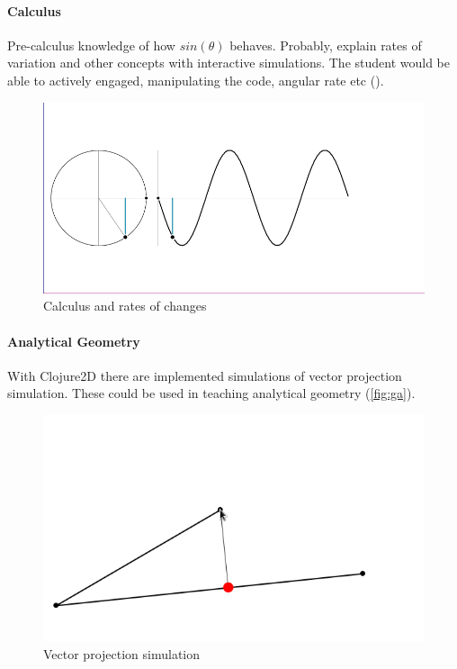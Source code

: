 \documentclass[
12pt,				%
openright,			%
oneside,			%
a4paper,			%
brazil,				%
english,			%
]{abntex2}
\begin{document}
\paragraph{Calculus}

Pre-calculus knowledge of how $sin(\theta)$ behaves. Probably, explain
rates of variation and other concepts with interactive
simulations. The student would be able to actively engaged, manipulating the
code, angular rate etc ().

\begin{figure}[ht]
  \centering
    \caption{\label{fig:calc} Calculus and rates of changes}
  \includegraphics[width=0.7\linewidth]{Imagens/CA/calc1-is.png}
\end{figure}

\paragraph{Analytical Geometry}

With Clojure2D there are implemented simulations of vector projection
simulation. These could be used in teaching analytical geometry (\autoref{fig:ga}).

\begin{figure}[ht]
  \centering
    \caption{\label{fig:ga} Vector projection simulation}
  \includegraphics[width=0.7\linewidth]{Imagens/CA/GA-is.png}
\end{figure}
\end{document}
